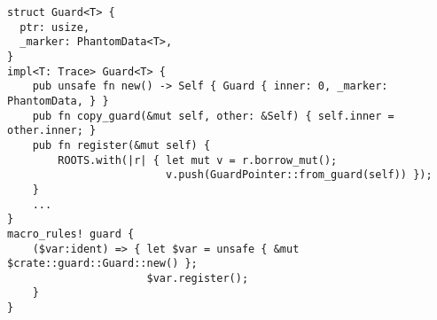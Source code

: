 \begin{lstlisting}[style=Rust,
caption=Excerpt of \mc{Guard}s definitions,label=lst:guard-impl]
struct Guard<T> {
  ptr: usize,
  _marker: PhantomData<T>,
}
impl<T: Trace> Guard<T> {
    pub unsafe fn new() -> Self { Guard { inner: 0, _marker: PhantomData, } }
    pub fn copy_guard(&mut self, other: &Self) { self.inner = other.inner; }
    pub fn register(&mut self) {
        ROOTS.with(|r| { let mut v = r.borrow_mut();
                         v.push(GuardPointer::from_guard(self)) });
    }
    ...
}
macro_rules! guard {
    ($var:ident) => { let $var = unsafe { &mut $crate::guard::Guard::new() };
                      $var.register();
    }
}\end{lstlisting}
